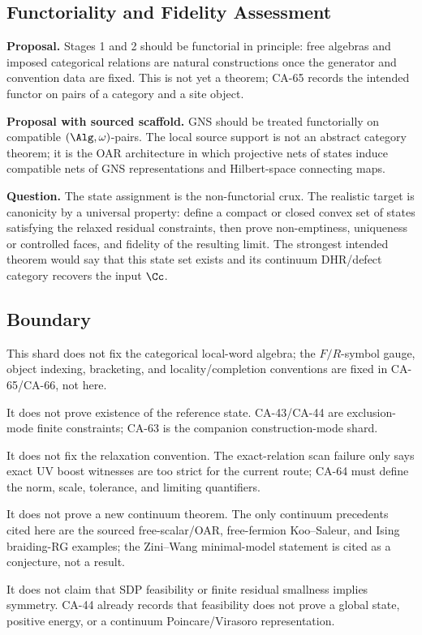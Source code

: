 \subsection{Functoriality and Fidelity Assessment}

\textbf{Proposal.}  Stages 1 and 2 should be functorial in principle: free
algebras and imposed categorical relations are natural constructions once the
generator and convention data are fixed.  This is not yet a theorem; CA-65
records the intended functor on pairs of a category and a site object.

\textbf{Proposal with sourced scaffold.}  GNS should be treated functorially on
compatible \((\Alg,\omega)\)-pairs.  The local source support is not an
abstract category theorem; it is the OAR architecture in which projective nets
of states induce compatible nets of GNS representations and Hilbert-space
connecting maps.

\textbf{Question.}  The state assignment is the non-functorial crux.  The
realistic target is canonicity by a universal property: define a compact or
closed convex set of states satisfying the relaxed residual constraints, then
prove non-emptiness, uniqueness or controlled faces, and fidelity of the
resulting limit.  The strongest intended theorem would say that this state set
exists and its continuum DHR/defect category recovers the input \(\Cc\).

\subsection{Boundary}

This shard does not fix the categorical local-word algebra; the \(F/R\)-symbol
gauge, object indexing, bracketing, and locality/completion conventions are
fixed in CA-65/CA-66, not here.

It does not prove existence of the reference state.  CA-43/CA-44 are
exclusion-mode finite constraints; CA-63 is the companion construction-mode
shard.

It does not fix the relaxation convention.  The exact-relation scan failure
only says exact UV boost witnesses are too strict for the current route; CA-64
must define the norm, scale, tolerance, and limiting quantifiers.

It does not prove a new continuum theorem.  The only continuum precedents cited
here are the sourced free-scalar/OAR, free-fermion Koo--Saleur, and Ising
braiding-RG examples; the Zini--Wang minimal-model statement is cited as a
conjecture, not a result.

It does not claim that SDP feasibility or finite residual smallness implies
symmetry.  CA-44 already records that feasibility does not prove a global
state, positive energy, or a continuum Poincare/Virasoro representation.
